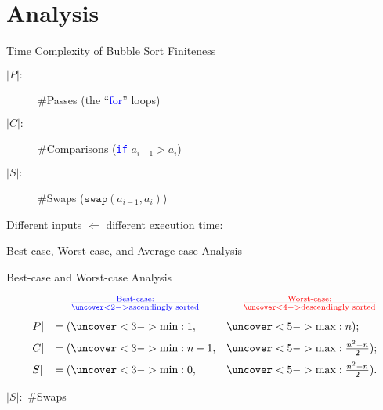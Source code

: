 \section{Analysis}

\begin{frame}{Time Complexity of Bubble Sort}
  Finiteness

  \pause

  \begin{description}
	\item[$|P|:$] \#Passes \hfill (the ``\textcolor{blue}{for}'' loops)
	\item[$|C|:$] \#Comparisons \hfill (\textcolor{blue}{\texttt{if}} $a_{i-1} > a_{i}$)
	\item[$|S|:$] \#Swaps  \hfill ($\texttt{swap}(a_{i-1}, a_{i})$)
  \end{description}

  \pause
  \vspace{0.30cm}

  Different inputs $\Longleftarrow$ different execution time:
  \begin{center}
	Best-case, Worst-case, and Average-case Analysis
  \end{center}
\end{frame}
\begin{frame}{Best-case and Worst-case Analysis}
  
  \begin{displaymath}
	\begin{array}{lll}
	  & \hfill \textcolor{blue}{\frac{\text{Best-case:}}{\uncover<2->{\text{ascendingly sorted}}}} \hfill 
	  & \hfill \textcolor{red}{\frac{\text{Worst-case:}}{\uncover<4->{\text{descendingly sorted}}}} \\[10pt]
	  |P| & = (\uncover<3->{\min: 1,} & \uncover<5->{\max: n}); \\[6pt]
	  |C| & = (\uncover<3->{\min: n-1,} & \uncover<5->{\max: \frac{n^2 - n}{2}}); \\[6pt]
	  |S| & = (\uncover<3->{\min: 0,} & \uncover<5->{\max: \frac{n^2 - n}{2}}).
	\end{array}
  \end{displaymath}

\end{frame}
\begin{frame}{$|S|:$ \#Swaps}
\end{frame}
